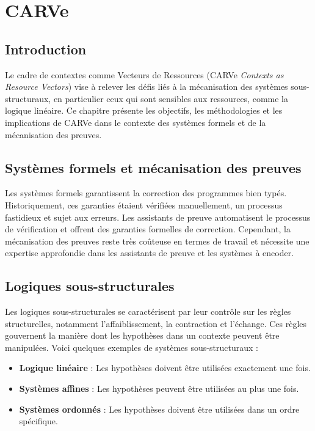 \chapter{CARVe}
\label{sec::chapitre3}

\section{Introduction}
Le cadre de contextes comme Vecteurs de Ressources (CARVe \textit{Contexts as Resource Vectors}) vise à relever les défis liés à la mécanisation des systèmes sous-structuraux, en particulier ceux qui sont sensibles aux ressources, comme la logique linéaire. Ce chapitre présente les objectifs, les méthodologies et les implications de CARVe dans le contexte des systèmes formels et de la mécanisation des preuves.

\section{Systèmes formels et mécanisation des preuves}
Les systèmes formels garantissent la correction des programmes bien typés. Historiquement, ces garanties étaient vérifiées manuellement, un processus fastidieux et sujet aux erreurs. Les assistants de preuve automatisent le processus de vérification et offrent des garanties formelles de correction. Cependant, la mécanisation des preuves reste très coûteuse en termes de travail et nécessite une expertise approfondie dans les assistants de preuve et les systèmes à encoder.

\section{Logiques sous-structurales}
Les logiques sous-structurales se caractérisent par leur contrôle sur les règles structurelles, notamment l'affaiblissement, la contraction et l'échange. Ces règles gouvernent la manière dont les hypothèses dans un contexte peuvent être manipulées. Voici quelques exemples de systèmes sous-structuraux :

\begin{itemize}
    \item \textbf{Logique linéaire} : Les hypothèses doivent être utilisées exactement une fois.
    \item \textbf{Systèmes affines} : Les hypothèses peuvent être utilisées au plus une fois.
    \item \textbf{Systèmes ordonnés} : Les hypothèses doivent être utilisées dans un ordre spécifique.
\end{itemize}

